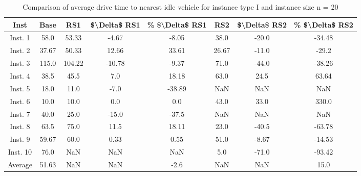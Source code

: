 \begin{table}[H]
\centering
\begin{tabular}{cccccccc}
  \hline
  \textbf{Inst} & \textbf{Base} & \textbf{RS1} & \textbf{\$\textbackslash{}Delta\$  RS1} & \textbf{\% \$\textbackslash{}Delta\$  RS1} & \textbf{RS2} & \textbf{\$\textbackslash{}Delta\$  RS2} & \textbf{\% \$\textbackslash{}Delta\$  RS2} \\\hline
  Inst. 1 & 58.0 & 53.33 & -4.67 & -8.05 & 38.0 & -20.0 & -34.48 \\
  Inst. 2 & 37.67 & 50.33 & 12.66 & 33.61 & 26.67 & -11.0 & -29.2 \\
  Inst. 3 & 115.0 & 104.22 & -10.78 & -9.37 & 71.0 & -44.0 & -38.26 \\
  Inst. 4 & 38.5 & 45.5 & 7.0 & 18.18 & 63.0 & 24.5 & 63.64 \\
  Inst. 5 & 18.0 & 11.0 & -7.0 & -38.89 & NaN & NaN & NaN \\
  Inst. 6 & 10.0 & 10.0 & 0.0 & 0.0 & 43.0 & 33.0 & 330.0 \\
  Inst. 7 & 40.0 & 25.0 & -15.0 & -37.5 & NaN & NaN & NaN \\
  Inst. 8 & 63.5 & 75.0 & 11.5 & 18.11 & 23.0 & -40.5 & -63.78 \\
  Inst. 9 & 59.67 & 60.0 & 0.33 & 0.55 & 51.0 & -8.67 & -14.53 \\
  Inst. 10 & 76.0 & NaN & NaN & NaN & 5.0 & -71.0 & -93.42 \\
  Average & 51.63 & NaN & NaN & -2.6 & NaN & NaN & 15.0 \\\hline
\end{tabular}
\caption{Comparison of average drive time to nearest idle vehicle for instance type I and instance size n = 20}
\label{tab:wait:resrelocation-nearest-drive-time-comparison_I_20}
\end{table}
